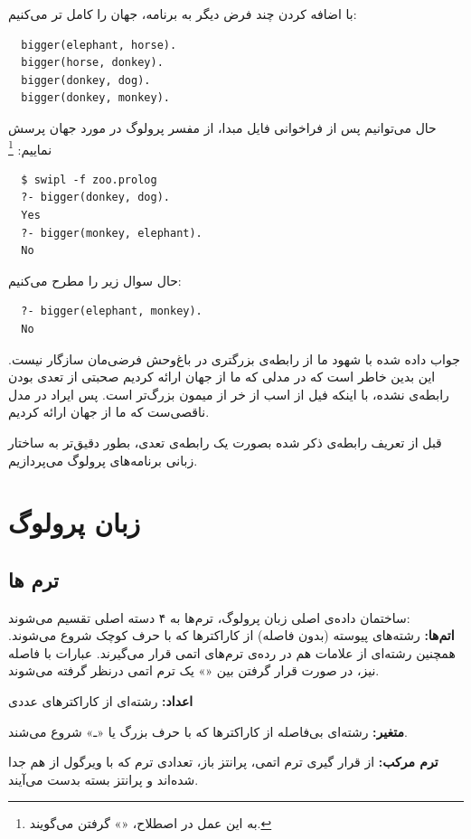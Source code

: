 \documentclass{article}
\begin{document}
با اضافه کردن چند فرض دیگر به برنامه، جهان را کامل تر می‌کنیم:
\begin{verbatim}
  bigger(elephant, horse).
  bigger(horse, donkey).
  bigger(donkey, dog).
  bigger(donkey, monkey).
\end{verbatim}

حال می‌توانیم پس از فراخوانی فایل مبدا، از مفسر پرولوگ در مورد جهان پرسش نماییم:
\footnote{به این عمل در اصطلاح، «» گرفتن می‌گویند.}
\begin{verbatim}
  $ swipl -f zoo.prolog
  ?- bigger(donkey, dog).
  Yes
  ?- bigger(monkey, elephant).
  No
\end{verbatim}
حال سوال زیر را مطرح می‌کنیم:
\begin{verbatim}
  ?- bigger(elephant, monkey).
  No
\end{verbatim}

\noindent جواب داده شده با شهود ما از رابطه‌ی بزرگتری در باغ‌وحش فرضی‌مان سازگار نیست.
این بدین خاطر است که در مدلی که ما از جهان
ارائه کردیم
صحبتی از تعدی بودن رابطه‌ی  نشده، با اینکه فیل از اسب از خر از میمون بزرگ‌تر است.
پس ایراد در مدل ناقصی‌ست که ما از
جهان ارائه کردیم.

\clearpage
{\Large \bf \* \vspace{3cm} \*

\noindent
قبل از تعریف رابطه‌ی ذکر شده بصورت یک رابطه‌ی تعدی، بطور دقیق‌تر به ساختار زبانی برنامه‌های
پرولوگ می‌پردازیم.
}
\clearpage

\section{ زبان پرولوگ}
\subsection{ترم ها}
ساختمان داده‌ی اصلی زبان پرولوگ، ترم‌ها به ۴ دسته اصلی تقسیم می‌شوند:
  \\
{\bf اتم‌ها:}
  رشته‌های پیوسته (بدون فاصله) از کاراکترها که با حرف کوچک شروع می‌شوند.
  همچنین رشته‌ای از علامات هم در رده‌ی ترم‌های اتمی قرار می‌گیرند.
  عبارات با فاصله نیز، در صورت قرار گرفتن بین «» یک ترم اتمی
  درنظر گرفته می‌شوند.
  \begin{flushleft}
  \end{flushleft}
{\bf اعداد:} رشته‌ای از کاراکتر‌های عددی
  \begin{flushleft}
  \end{flushleft}
{\bf متغیر:} رشته‌ای بی‌فاصله از کاراکتر‌ها که با حرف بزرگ یا «ـ» شروع می‌شند.
  \begin{flushleft}
  \end{flushleft}
{\bf ترم مرکب:} از قرار گیری ترم اتمی، پرانتز باز، تعدادی ترم که با ویرگول از هم جدا شده‌اند و پرانتز بسته بدست می‌آیند.
  \begin{flushleft}
  \end{flushleft}
\end{document}
